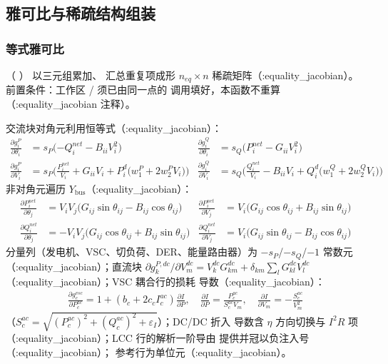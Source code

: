\subsection{雅可比与稀疏结构组装}

\subsubsection*{等式雅可比}
（
）
以三元组累加、 汇总重复项成形
$n_{eq}\times n$ 稀疏矩阵（:equality\_jacobian）。前置条件：工作区
/ 须已由同一点的
 调用填好，本函数不重算（:equality\_jacobian
注释）。

交流块对角元利用恒等式（:equality\_jacobian）：
\begin{align*}
\frac{\partial g^P_i}{\partial\theta_i}&=s_P\big({-Q^{net}_i}-B_{ii}V_i^2\big)
&\frac{\partial g^Q_i}{\partial\theta_i}&=s_Q\big(P^{net}_i-G_{ii}V_i^2\big)\\
\frac{\partial g^P_i}{\partial V_i}&=s_P\Big(\frac{P^{net}_i}{V_i}+G_{ii}V_i
 +P^d_i\big(w^{P}_1+2w^{P}_2V_i\big)\Big)
&\frac{\partial g^Q_i}{\partial V_i}&=s_Q\Big(\frac{Q^{net}_i}{V_i}-B_{ii}V_i
 +Q^d_i\big(w^{Q}_1+2w^{Q}_2V_i\big)\Big)
\end{align*}
非对角元遍历 $Y_{\mathrm{bus}}$（:equality\_jacobian）：
\begin{align*}
\frac{\partial P^{net}_i}{\partial\theta_j}&=V_iV_j\big(G_{ij}\sin\theta_{ij}-B_{ij}\cos\theta_{ij}\big)
&\frac{\partial P^{net}_i}{\partial V_j}&=V_i\big(G_{ij}\cos\theta_{ij}+B_{ij}\sin\theta_{ij}\big)\\
\frac{\partial Q^{net}_i}{\partial\theta_j}&=-V_iV_j\big(G_{ij}\cos\theta_{ij}+B_{ij}\sin\theta_{ij}\big)
&\frac{\partial Q^{net}_i}{\partial V_j}&=V_i\big(G_{ij}\sin\theta_{ij}-B_{ij}\cos\theta_{ij}\big)
\end{align*}
分量列（发电机、VSC、切负荷、DER、能量路由器）为 $-s_P$/$-s_Q$/$-1$
常数元（:equality\_jacobian）；直流块
$\partial g^{P,dc}_k/\partial V^{dc}_m=V^{dc}_kG^{dc}_{km}
+\delta_{km}\sum_lG^{dc}_{kl}V^{dc}_l$（:equality\_jacobian）；VSC 耦合行的损耗
导数（:equality\_jacobian）：
\begin{align*}
\frac{\partial g^{vsc}_c}{\partial P^{ac}_c}=1+(b_c+2c_cI^{ac}_c)\frac{\partial I}{\partial P},\quad
\frac{\partial I}{\partial P}=\frac{P^{ac}_c}{S^{ac}_cV_m},\quad
\frac{\partial I}{\partial V_m}=-\frac{S^{ac}_c}{V_m^2}
\end{align*}
（$S^{ac}_c=\sqrt{(P^{ac}_c)^2+(Q^{ac}_c)^2+\varepsilon_I}$）；DC/DC 折入
导数含 $\eta$ 方向切换与 $I^2R$ 项（:equality\_jacobian）；LCC 行的解析一阶导由
 提供并冠以负注入号（:equality\_jacobian）；
参考行为单位元（:equality\_jacobian）。

